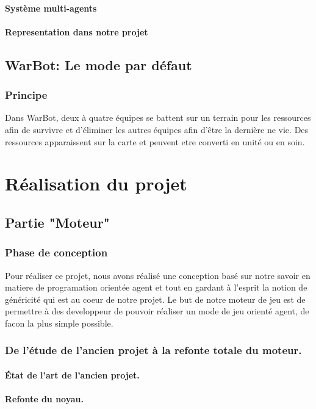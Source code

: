 \documentclass{report}
\begin{document}
\subsection{Système multi-agents}
\subsection{Representation dans notre projet}
\newpage
\chapter{WarBot: Le mode par défaut}
\section{Principe}
Dans WarBot, deux à quatre équipes se battent sur un terrain pour les ressources afin de survivre et d'éliminer les autres équipes afin d’être la dernière ne vie. Des ressources apparaissent sur la carte et peuvent etre converti en unité ou en soin.

\newpage
\part{Réalisation du projet}
\newpage

\chapter{Partie "Moteur"}
\section{Phase de conception}
Pour réaliser ce projet, nous avons réalisé une conception basé sur notre savoir en matiere de programation orientée agent et tout en gardant à l'esprit la notion de généricité qui est au coeur de notre projet.
Le but de notre moteur de jeu est de permettre à des developpeur de pouvoir réaliser un mode de jeu orienté agent, de facon la plus simple possible.
\section{De l'étude de l'ancien projet à la refonte totale du moteur.}
\subsection{État de l'art de l'ancien projet.}


\subsection{Refonte du noyau.}
\end{document}
